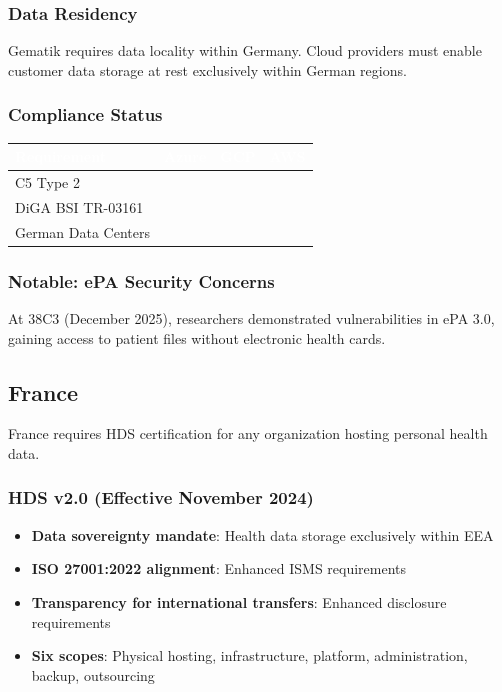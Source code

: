 \documentclass[11pt,a4paper]{article}
\newcommand{\compliant}{\textcolor{msgreen}{\checkmark}}
\begin{document}
\subsubsection{Data Residency}

Gematik requires data locality within Germany. Cloud providers must enable customer data storage at rest exclusively within German regions.

\subsubsection{Compliance Status}

\begin{center}
\begin{tabular}{L{3cm}C{2cm}C{2cm}C{2cm}}
\toprule
{}
\textcolor{white}{\textbf{Requirement}} & \textcolor{white}{\textbf{Azure}} & \textcolor{white}{\textbf{GCP}} & \textcolor{white}{\textbf{AWS}} \\
\midrule
C5 Type 2 & \compliant & \compliant & \compliant \\
DiGA BSI TR-03161 & \compliant & \compliant & \compliant \\
German Data Centers & \compliant & \compliant & \compliant \\
\bottomrule
\end{tabular}
\end{center}

\subsubsection{Notable: ePA Security Concerns}

At 38C3 (December 2025), researchers demonstrated vulnerabilities in ePA 3.0, gaining access to patient files without electronic health cards.

\subsection{France}

France requires HDS certification for any organization hosting personal health data.

\subsubsection{HDS v2.0 (Effective November 2024)}

\begin{itemize}
    \item \textbf{Data sovereignty mandate}: Health data storage exclusively within EEA
    \item \textbf{ISO 27001:2022 alignment}: Enhanced ISMS requirements
    \item \textbf{Transparency for international transfers}: Enhanced disclosure requirements
    \item \textbf{Six scopes}: Physical hosting, infrastructure, platform, administration, backup, outsourcing
\end{itemize}
\end{document}
